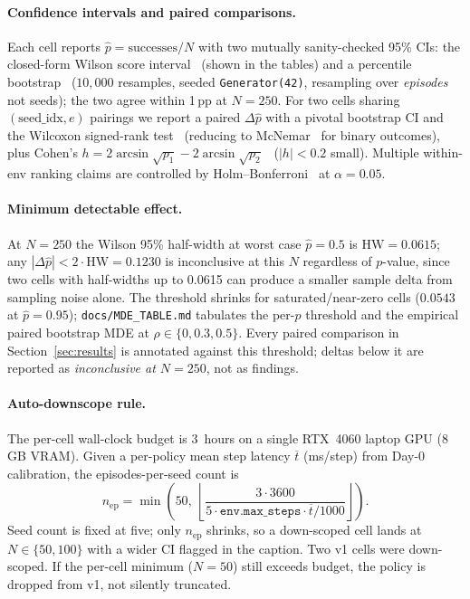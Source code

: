 \documentclass[10pt]{article}
\begin{document}
\paragraph{Confidence intervals and paired comparisons.}
Each cell reports $\hat{p}{=}\text{successes}/N$ with two mutually
sanity-checked 95\% CIs: the closed-form Wilson score
interval~\cite{wilson1927probable,agresti1998approximate} (shown in the
tables) and a percentile bootstrap~\cite{efron1979bootstrap,efron1993introduction}
($10{,}000$ resamples, seeded \texttt{Generator(42)}, resampling over
\emph{episodes} not seeds); the two agree within 1\,pp at $N{=}250$. For
two cells sharing $(\text{seed\_idx}, e)$ pairings we report a paired
$\Delta\hat{p}$ with a pivotal bootstrap CI and the Wilcoxon
signed-rank test~\cite{wilcoxon1945individual} (reducing to
McNemar~\cite{mcnemar1947note} for binary outcomes), plus Cohen's
$h{=}2\arcsin\!\sqrt{p_1}-2\arcsin\!\sqrt{p_2}$~\cite{cohen1988statistical}
($|h|{<}0.2$ small). Multiple within-env ranking claims are controlled by
Holm--Bonferroni~\cite{bonferroni1936teoria} at $\alpha{=}0.05$.

\paragraph{Minimum detectable effect.}
At $N{=}250$ the Wilson 95\% half-width at worst case $\hat{p}{=}0.5$ is
$\text{HW}=0.0615$; any $|\Delta\hat{p}| < 2\cdot\text{HW} = 0.1230$ is
inconclusive at this $N$ regardless of $p$-value, since two cells with
half-widths up to 0.0615 can produce a smaller sample delta from
sampling noise alone. The threshold shrinks for saturated/near-zero
cells ($0.0543$ at $\hat{p}{=}0.95$); \texttt{docs/MDE\_TABLE.md}
tabulates the per-$\hat{p}$ threshold and the empirical paired bootstrap
MDE at $\rho\in\{0,0.3,0.5\}$. Every paired comparison in
Section~\ref{sec:results} is annotated against this threshold; deltas
below it are reported as \emph{inconclusive at $N{=}250$}, not as
findings.

\paragraph{Auto-downscope rule.}
\label{sec:downscope}
The per-cell wall-clock budget is 3~hours on a single RTX~4060 laptop
GPU (8\,GB VRAM). Given a per-policy mean step latency $\overline{t}$
(ms/step) from Day-0 calibration, the episodes-per-seed count is
\begin{equation}
    n_\text{ep} = \min\!\left(50,\ \left\lfloor
        \frac{3 \cdot 3600}{5 \cdot \texttt{env.max\_steps} \cdot
        \overline{t} / 1000} \right\rfloor\right).
\end{equation}
Seed count is fixed at five; only $n_\text{ep}$ shrinks, so a
down-scoped cell lands at $N\in\{50,100\}$ with a wider CI flagged in
the caption. Two v1 cells were down-scoped. If the per-cell
minimum ($N{=}50$) still exceeds budget, the policy is dropped from v1,
not silently truncated.
\end{document}
